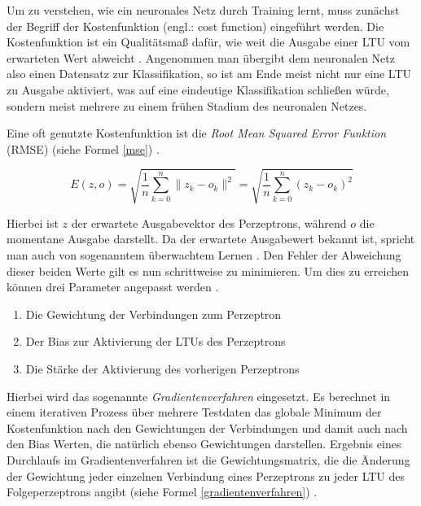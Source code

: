 Um zu verstehen, wie ein neuronales Netz durch Training lernt, muss zunächst der Begriff der Kostenfunktion (engl.: cost function) eingeführt werden. Die Kostenfunktion ist ein Qualitätsmaß dafür, wie weit die Ausgabe einer LTU vom erwarteten Wert abweicht \cite[S. 112 ff.]{AurelienGeron.2018}. Angenommen man übergibt dem neuronalen Netz also einen Datensatz zur Klassifikation, so ist am Ende meist nicht nur eine LTU zu Ausgabe aktiviert, was auf eine eindeutige Klassifikation schließen würde, sondern meist mehrere zu einem frühen Stadium des neuronalen Netzes.

Eine oft genutzte Kostenfunktion ist die \textit{Root Mean Squared Error Funktion} (RMSE) (siehe Formel \ref{mse}) \cite[S. 37 f.]{AurelienGeron.2018}.

\begin{equation} \label{mse}
E(z,o) = \sqrt{\frac{1}{n}\sum_{k=0}^n \lVert{z_k-o_k}\rVert^2} = \sqrt{\frac{1}{n}\sum_{k=0}^n (z_k-o_k)^2}
\end{equation}

Hierbei ist $z$ der erwartete Ausgabevektor des Perzeptrons, während $o$ die momentane Ausgabe darstellt. Da der erwartete Ausgabewert bekannt ist, spricht man auch von sogenanntem überwachtem Lernen \cite[S. 8 f.]{AurelienGeron.2018}. Den Fehler der Abweichung dieser beiden Werte gilt es nun schrittweise zu minimieren. Um dies zu erreichen können drei Parameter angepasst werden \cite[S. 112 ff.]{AurelienGeron.2018}.

\begin{enumerate}
	\item Die Gewichtung der Verbindungen zum Perzeptron
	\item Der Bias zur Aktivierung der LTUs des Perzeptrons
	\item Die Stärke der Aktivierung des vorherigen Perzeptrons
\end{enumerate}

Hierbei wird das sogenannte \textit{Gradientenverfahren} eingesetzt. Es berechnet in einem iterativen Prozess über mehrere Testdaten das globale Minimum der Kostenfunktion nach den Gewichtungen der Verbindungen und damit auch nach den Bias Werten, die natürlich ebenso Gewichtungen darstellen. Ergebnis eines Durchlaufs im Gradientenverfahren ist die Gewichtungsmatrix, die die Änderung der Gewichtung jeder einzelnen Verbindung eines Perzeptrons zu jeder LTU des Folgeperzeptrons angibt (siehe Formel \ref{gradientenverfahren}) \cite[S. 112 ff.]{AurelienGeron.2018}.

